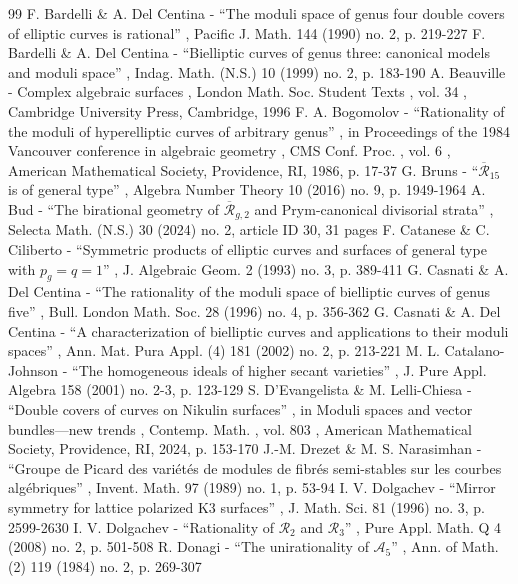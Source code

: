 \documentclass[11pt]{article}
\theoremstyle{plain}
\theoremstyle{definition}
\begin{document}

\begin{thebibliography}{99}
 F. Bardelli \& A. Del Centina - “The moduli space of genus four double covers of elliptic curves is rational” , Pacific J. Math. 144 (1990) no. 2, p. 219-227
 F. Bardelli \& A. Del Centina - “Bielliptic curves of genus three: canonical models and moduli space” , Indag. Math. (N.S.) 10 (1999) no. 2, p. 183-190
 A. Beauville - Complex algebraic surfaces , London Math. Soc. Student Texts , vol. 34 , Cambridge University Press, Cambridge, 1996
 F. A. Bogomolov - “Rationality of the moduli of hyperelliptic curves of arbitrary genus” , in Proceedings of the 1984 Vancouver conference in algebraic geometry , CMS Conf. Proc. , vol. 6 , American Mathematical Society, Providence, RI, 1986, p. 17-37
 G. Bruns - “$\overline{\mathcal{R}}_{15}$ is of general type” , Algebra Number Theory 10 (2016) no. 9, p. 1949-1964
 A. Bud - “The birational geometry of $\overline{\mathcal{R}}_{g,2}$ and Prym-canonical divisorial strata” , Selecta Math. (N.S.) 30 (2024) no. 2, article ID 30, 31 pages
 F. Catanese \& C. Ciliberto - “Symmetric products of elliptic curves and surfaces of general type with $p_g=q=1$” , J. Algebraic Geom. 2 (1993) no. 3, p. 389-411
 G. Casnati \& A. Del Centina - “The rationality of the moduli space of bielliptic curves of genus five” , Bull. London Math. Soc. 28 (1996) no. 4, p. 356-362
 G. Casnati \& A. Del Centina - “A characterization of bielliptic curves and applications to their moduli spaces” , Ann. Mat. Pura Appl. (4) 181 (2002) no. 2, p. 213-221
 M. L. Catalano-Johnson - “The homogeneous ideals of higher secant varieties” , J. Pure Appl. Algebra 158 (2001) no. 2-3, p. 123-129
 S. D’Evangelista \& M. Lelli-Chiesa - “Double covers of curves on Nikulin surfaces” , in Moduli spaces and vector bundles—new trends , Contemp. Math. , vol. 803 , American Mathematical Society, Providence, RI, 2024, p. 153-170
 J.-M. Drezet \& M. S. Narasimhan - “Groupe de Picard des variétés de modules de fibrés semi-stables sur les courbes algébriques” , Invent. Math. 97 (1989) no. 1, p. 53-94
 I. V. Dolgachev - “Mirror symmetry for lattice polarized K3 surfaces” , J. Math. Sci. 81 (1996) no. 3, p. 2599-2630
 I. V. Dolgachev - “Rationality of $\mathcal{R}_2$ and $\mathcal{R}_3$” , Pure Appl. Math. Q 4 (2008) no. 2, p. 501-508
 R. Donagi - “The unirationality of ${\mathcal{A}}_{5}$” , Ann. of Math. (2) 119 (1984) no. 2, p. 269-307

\end{thebibliography}
\end{document}
